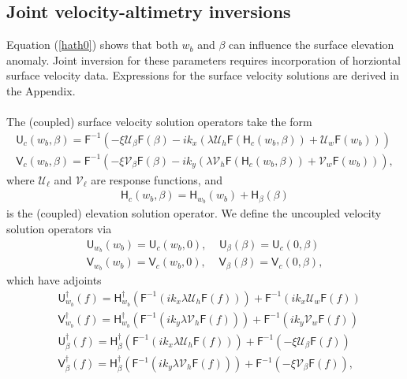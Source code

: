 \documentclass[paper=a4, fontsize=11pt]{article}
\begin{document}
\subsection*{Joint velocity-altimetry inversions}
Equation (\ref{hath0}) shows that both $w_b$ and $\beta$ can influence the surface elevation anomaly.
Joint inversion for these parameters requires incorporation of horziontal surface
velocity data. Expressions for the surface velocity solutions are derived
in the Appendix.
\\ \\
The (coupled) surface velocity solution operators take the form
\begin{align}
\mathsf{U}_c(w_b,\beta) =  \mathsf{F}^{-1}(-\xi\mathcal{U}_{\beta} \mathsf{F}({\beta}) -ik_x\left(\lambda\mathcal{U}_h\mathsf{F}( \mathsf{H}_c(w_b,\beta) ) +  \mathcal{U}_w\mathsf{F}(w_b)\right)) \label{U}\\
\mathsf{V}_c(w_b,\beta) =  \mathsf{F}^{-1}(-\xi\mathcal{V}_{\beta} \mathsf{F}({\beta}) -ik_y\left(\lambda\mathcal{V}_h\mathsf{F}( \mathsf{H}_c(w_b,\beta) ) +  \mathcal{V}_w\mathsf{F}(w_b)\right))\label{V},
\end{align}
where $\mathcal{U}_\ell$ and $\mathcal{V}_\ell$ are response functions, and
\begin{align}
\mathsf{H}_c(w_b,\beta) = \mathsf{H}_{w_b}(w_b) + \mathsf{H}_{\beta}(\beta)
\end{align}
is the (coupled) elevation solution operator.
We define the uncoupled velocity solution operators via
\begin{align}
\mathsf{U}_{w_b} (w_b) = \mathsf{U}_c(w_b,0), \;\;\;\; \mathsf{U}_{\beta} (\beta) = \mathsf{U}_c(0,\beta) \\
\mathsf{V}_{w_b} (w_b) = \mathsf{V}_c(w_b,0), \;\;\;\; \mathsf{V}_{\beta} (\beta) = \mathsf{V}_c(0,\beta),
\end{align}
which have adjoints
\begin{align}
&\mathsf{U}_{w_b}^\dagger (f) =
\mathsf{H}_{w_b}^{\dagger}(\mathsf{F}^{-1}( ik_x\lambda\mathcal{U}_h\mathsf{F}( f )))
+  \mathsf{F}^{-1}(ik_x{\mathcal{U}_w}\mathsf{F}(f)) \\
&\mathsf{V}_{w_b}^\dagger (f) =
\mathsf{H}_{w_b}^{\dagger}(\mathsf{F}^{-1}( ik_y\lambda\mathcal{V}_h\mathsf{F}( f )))
+  \mathsf{F}^{-1}(ik_y{\mathcal{V}_w}\mathsf{F}(f))\\
&\mathsf{U}_{\beta}^\dagger (f) =
\mathsf{H}_{\beta}^{\dagger}(\mathsf{F}^{-1}( ik_x\lambda\mathcal{U}_h\mathsf{F}( f )))
+  \mathsf{F}^{-1}(-\xi{\mathcal{U}_\beta}\mathsf{F}(f)) \\
&\mathsf{V}_{\beta}^\dagger (f) =
\mathsf{H}_{\beta}^{\dagger}(\mathsf{F}^{-1}( ik_y\lambda\mathcal{V}_h\mathsf{F}( f )))
+  \mathsf{F}^{-1}(-\xi{\mathcal{V}_\beta}\mathsf{F}(f)),
\end{align}
\end{document}
